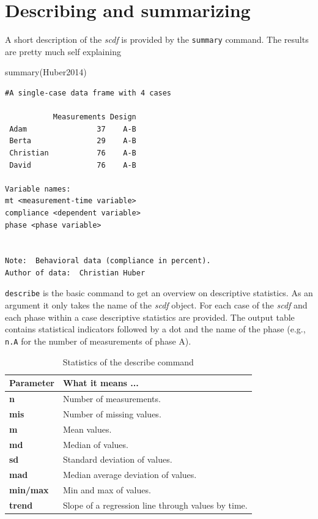 \documentclass[
]{book}
\newenvironment{Shaded}{\begin{snugshade}}{\end{snugshade}}
\newcommand{\FunctionTok}[1]{\textcolor[rgb]{0.00,0.00,0.00}{#1}}
\newcommand{\NormalTok}[1]{#1}
\begin{document}
\hypertarget{describing-and-summarizing}{%
\section{Describing and summarizing}\label{describing-and-summarizing}}

A short description of the \emph{scdf} is provided by the \texttt{summary} command. The results are pretty much self explaining

\begin{Shaded}
\begin{Highlighting}[]
\FunctionTok{summary}\NormalTok{(Huber2014)}
\end{Highlighting}
\end{Shaded}

\begin{verbatim}
#A single-case data frame with 4 cases

           Measurements Design
 Adam                37    A-B
 Berta               29    A-B
 Christian           76    A-B
 David               76    A-B

Variable names:
mt <measurement-time variable>
compliance <dependent variable>
phase <phase variable>


Note:  Behavioral data (compliance in percent).
Author of data:  Christian Huber 
\end{verbatim}

\texttt{describe} is the basic command to get an overview on descriptive statistics. As an argument it only takes the name of the \emph{scdf} object. For each case of the \emph{scdf} and each phase within a case descriptive statistics are provided. The output table contains statistical indicators followed by a dot and the name of the phase (e.g., \texttt{n.A} for the number of measurements of phase A).

\begin{table}

\caption{\label{tab:table-describe}Statistics of the describe command}
\begin{tabular}[t]{>{\raggedright\arraybackslash}p{15em}>{\raggedright\arraybackslash}p{30em}}
\toprule
Parameter & What it means ...\\
\midrule
\textbf{n} & Number of measurements.\\
\textbf{mis} & Number of missing values.\\
\textbf{m} & Mean values.\\
\textbf{md} & Median of values.\\
\textbf{sd} & Standard deviation of values.\\
\textbf{mad} & Median average deviation of values.\\
\textbf{min/max} & Min and max of values.\\
\textbf{trend} & Slope of a regression line through values by time.\\
\bottomrule
\end{tabular}
\end{table}
\end{document}
